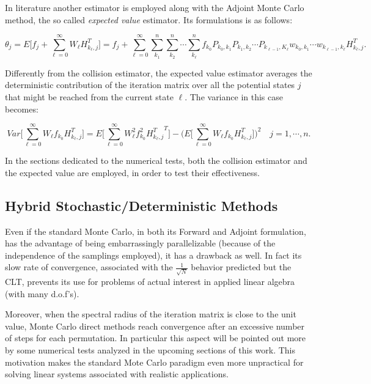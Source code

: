 \documentclass[a4paper,10pt]{article}
\begin{document}
In literature another estimator is employed along with the Adjoint Monte Carlo
method, the so called \textit{expected value} estimator. Its
formulations is as follows:

\begin{equation}
\theta_j=E\bigg[f_j + \sum_{\ell=0}^\infty
W_{\ell}H_{k_{\ell}, j}^T\bigg]=f_j
+ \sum_{\ell=0}^{\infty}\sum_{k_1}^n\sum_{k_2} ^n\cdots\sum_ { k_ { \ell}}^n
f_{k_0}P_{k_0,k_1}P_{k_1,k_2}\cdots P_{k_{\ell-1},K_{\ell}}w_{k_0,k_1}\cdots
w_{k_{\ell-1},k_{\ell}}H_{k_{\ell},j}^T.
\label{adj_mean1}
\end{equation}

Differently from the collision estimator, the expected value estimator averages
the deterministic contribution of the iteration matrix over all the potential
states $j$ that might be reached from the current state $\ell$. The variance
in this case becomes:

\begin{equation}
Var\bigg [\sum_{\ell=0}^\infty W_{\ell}
f_{k_0}H_{k_{\ell},j}^T\bigg]=E\bigg[\sum_{\ell=0}^\infty W_{\ell}^2
f_{k_0}^2 {H_{k_{\ell},j}^T}^T\bigg ] - \bigg (E\bigg[\sum_{\ell=0}^\infty
W_{\ell}
f_{k_0}H_{k_{\ell},j}^T\bigg]\bigg )^2\quad j=1,\cdots,n
\label{adj_var}.
\end{equation}

In the sections dedicated to the numerical tests, both the collision estimator
and the expected value are employed, in order to test their effectiveness.

\subsection{Hybrid Stochastic/Deterministic Methods}

Even if the standard Monte Carlo, in both its Forward and Adjoint formulation,
has the advantage of being embarrassingly parallelizable (because of the
independence of the samplings employed), it has a drawback as
well. In fact its slow rate of convergence, associated with the
$\frac{1}{\sqrt{N}}$ behavior predicted but the CLT, prevents its use for
problems of actual interest in applied linear algebra (with many d.o.f's).

Moreover, when the spectral radius of the iteration matrix is close to the
unit
value, Monte Carlo direct methods reach convergence after an excessive number
of steps for each
permutation. In particular this aspect will be pointed out more by some
numerical tests analyzed in the upcoming sections of this work.
This motivation makes the standard Mote Carlo paradigm even more
unpractical for solving linear systems associated with realistic applications.
\newline
\end{document}
